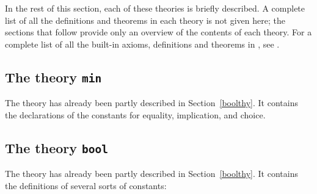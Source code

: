 \noindent In the rest of this section, each of these theories is briefly
described.  A complete list of all the definitions and theorems in each
theory is not given here; the sections that follow provide only an
overview of the contents of each theory.  For a complete list of all the
built-in axioms, definitions and theorems in \HOL, see \REFERENCE.

\subsection{The theory {\tt min}}\label{minTheory}

The theory  has already been partly described in
Section~\ref{boolthy}.
It contains the declarations of the constants for equality, implication,
and choice.

\subsection{The theory {\tt bool}}\label{boolfull}

The theory  has already been partly described in
Section~\ref{boolthy}.
It contains the definitions of several sorts of constants:

